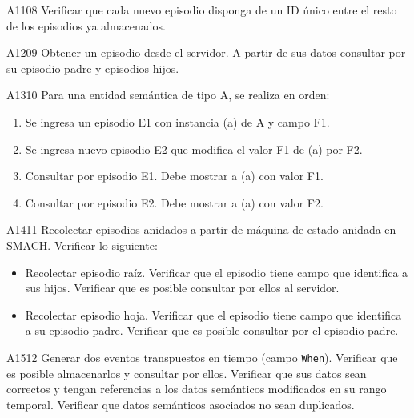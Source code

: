\begin{def-validacion}{A}{11}{08}
Verificar que cada nuevo episodio disponga de un ID único entre el resto de los episodios ya almacenados.	
\end{def-validacion}

\begin{def-validacion}{A}{12}{09}
	Obtener un episodio desde el servidor. A partir de sus datos consultar por su episodio padre y episodios hijos.	
\end{def-validacion}

\begin{def-validacion}{A}{13}{10}
	Para una entidad semántica de tipo A, se realiza en orden:
	\begin{enumerate}
		\item Se ingresa un episodio E1 con instancia (a) de A y campo F1.
		\item Se ingresa nuevo episodio E2 que modifica el valor F1 de (a) por F2.
		\item Consultar por episodio E1. Debe mostrar a (a) con valor F1.
		\item Consultar por episodio E2. Debe mostrar a (a) con valor F2.
	\end{enumerate}
\end{def-validacion}

\begin{def-validacion}{A}{14}{11}
	Recolectar episodios anidados a partir de máquina de estado anidada en SMACH. Verificar lo siguiente:
	\begin{itemize}
		\item Recolectar episodio raíz. Verificar que el episodio tiene campo que identifica a sus hijos. Verificar que es posible consultar por ellos al servidor.
		\item Recolectar episodio hoja. Verificar que el episodio tiene campo que identifica a su episodio padre. Verificar que es posible consultar por el episodio padre.
	\end{itemize}
\end{def-validacion}

\begin{def-validacion}{A}{15}{12}
	Generar dos eventos transpuestos en tiempo (campo \texttt{When}). Verificar que es posible almacenarlos y consultar por ellos. Verificar que sus datos sean correctos y tengan referencias a los datos semánticos modificados en su rango temporal. Verificar que datos semánticos asociados no sean duplicados.
\end{def-validacion}

